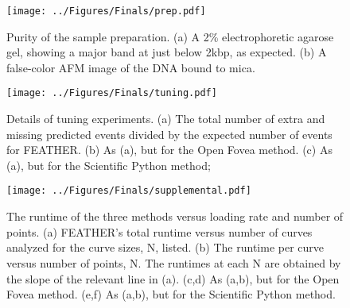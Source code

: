 \documentclass[%
  aip,12pt,tightenlines,
  amsthm,
 amsmath,amssymb
]{article}
\newcommand{\fLabel}[1]{\label{figure:#1}}
\newcommand{\pEndF}[0]{ \\ }
\newcommand{\pStartF}[0]{ }
\newcommand{\name}[0]{FEATHER}
\newcommand{\figwidth}[0]{\linewidth}
\begin{document}
\begin{figure}
\centering
\texttt{[image: ../Figures/Finals/prep.pdf]}%
\caption[Verification of sample purity]{\noindent\fLabel{Prep}\pStartF Purity of the sample preparation. (a) A 2\% electrophoretic agarose gel, showing a major band at just below 2kbp, as expected. (b) A false-color AFM image of the DNA bound to mica. \pEndF }
\end{figure}


\begin{figure}
\centering
\texttt{[image: ../Figures/Finals/tuning.pdf]}%
\caption[Cross validation of algorithms and optimal parameters]{\noindent\fLabel{Tuning}\pStartF Details of tuning experiments. (a) The total number of extra and missing predicted events divided by the expected number of events for \name{}. (b) As (a), but for the Open Fovea method. (c) As (a), but for the Scientific Python method; \pEndF }
\end{figure}



\begin{figure}
\centering
\texttt{[image: ../Figures/Finals/supplemental.pdf]}%
\caption[Algorithmic runtime versus loading rate]{\noindent\fLabel{Timing_Details}\pStartF The runtime of the three methods versus loading rate and number of points. (a) \name{}'s total runtime versus number of curves analyzed for the curve sizes, N, listed. (b) The runtime per curve versus number of points, N. The runtimes at each N are obtained by the slope of the relevant line in (a).  (c,d) As (a,b), but for the Open Fovea method. (e,f) As (a,b), but for the Scientific Python method. \pEndF }
\end{figure}
\end{document}
